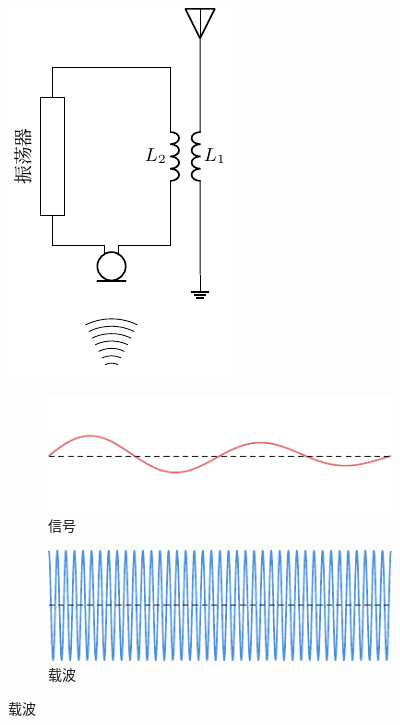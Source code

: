 \begin{figure}[htbp]
    \centering
    \begin{minipage}[b]{0.25\linewidth}
    	\centering
    	\includegraphics{fig/C/4-13.pdf}
    	\begin{subfigure}{0.001\linewidth}
    	\end{subfigure}
    	\caption{调制}\label{fig_C_4-13}
    \end{minipage}
    \begin{minipage}[b]{0.7\linewidth}
    	 \centering
    	\begin{subfigure}{0.9\linewidth}
    		\centering
    		\includegraphics{fig/C/4-14a.pdf}
    		\caption{信号}\label{fig_C_4-14a}
    	\end{subfigure}
    	\hfil
    	\begin{subfigure}{0.9\linewidth}
    		\centering
    		\includegraphics{fig/C/4-14b.pdf}
    		\caption{载波}\label{fig_C_4-14b}
    	\end{subfigure}

\end{minipage}
\end{figure}
